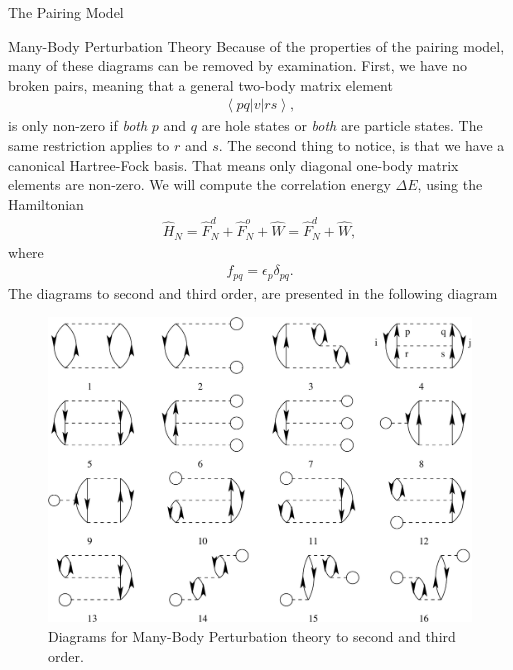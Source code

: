 \documentclass[twoside,english]{uiofysmaster}
\begin{document}
\begin{chapter}{The Pairing Model}
\begin{section}{Many-Body Perturbation Theory}
		Because of the properties of the pairing model, many
                of these diagrams can be removed by 
                examination. First, we have no broken pairs, meaning
                that a general two-body matrix element
		\begin{align}
			\left< pq | v | rs \right>,
		\end{align}
		is only non-zero if \textit{both} $p$ and $q$ are hole
                states or \textit{both} are particle states. The same
                restriction applies to $r$ and $s$. The second thing
                to notice, is that we have a canonical
                Hartree-Fock basis. That means only diagonal one-body matrix
                elements are non-zero. We will compute the correlation
                energy $\Delta E$, using the Hamiltonian
		\begin{align}
			\hat H_N = \hat F_N^d + \hat F_N^o + \hat W = \hat F_N^d + \hat W,
		\end{align}
		where
		\begin{align}
			f_{pq} = \epsilon_p \delta_{pq}.
		\end{align}
		The diagrams to second and third order, are presented in the following diagram
 		\begin{figure}[H]
			\includegraphics[width=\textwidth]{Figures/FirstSecondThirdOrder.pdf}
			\caption{Diagrams for Many-Body Perturbation theory to second and third order. }
			\label{figure:mbpt23}
		\end{figure}


\end{section}
\end{chapter}
\end{document}
